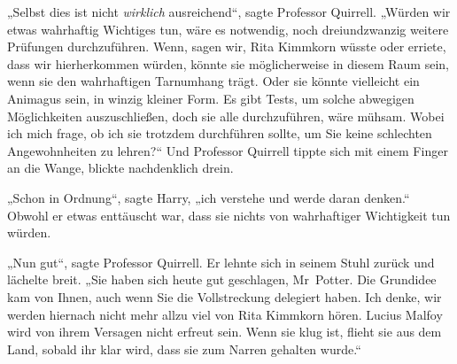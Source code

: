 „Selbst dies ist nicht \emph{wirklich} ausreichend“, sagte Professor Quirrell. „Würden wir etwas wahrhaftig Wichtiges tun, wäre es notwendig, noch dreiundzwanzig weitere Prüfungen durchzuführen. Wenn, sagen wir, Rita Kimmkorn wüsste oder erriete, dass wir hierherkommen würden, könnte sie möglicherweise in diesem Raum sein, wenn sie den wahrhaftigen Tarnumhang trägt. Oder sie könnte vielleicht ein Animagus sein, in winzig kleiner Form. Es gibt Tests, um solche abwegigen Möglichkeiten auszuschließen, doch sie alle durchzuführen, wäre mühsam. Wobei ich mich frage, ob ich sie trotzdem durchführen sollte, um Sie keine schlechten Angewohnheiten zu lehren?“ Und Professor Quirrell tippte sich mit einem Finger an die Wange, blickte nachdenklich drein.

„Schon in Ordnung“, sagte Harry, „ich verstehe und werde daran denken.“ Obwohl er etwas enttäuscht war, dass sie nichts von wahrhaftiger Wichtigkeit tun würden.

„Nun gut“, sagte Professor Quirrell. Er lehnte sich in seinem Stuhl zurück und lächelte breit. „Sie haben sich heute gut geschlagen, Mr~Potter. Die Grundidee kam von Ihnen, auch wenn Sie die Vollstreckung delegiert haben. Ich denke, wir werden hiernach nicht mehr allzu viel von Rita Kimmkorn hören. Lucius Malfoy wird von ihrem Versagen nicht erfreut sein. Wenn sie klug ist, flieht sie aus dem Land, sobald ihr klar wird, dass sie zum Narren gehalten wurde.“

